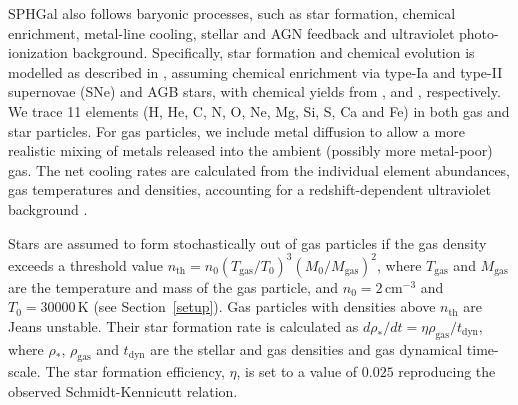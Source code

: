 \documentclass[fleqn,usenatbib]{mnras}
\begin{document}
SPHGal also follows baryonic
processes, such as star formation, chemical enrichment, metal-line
cooling, stellar and AGN feedback and ultraviolet photo-ionization
background. Specifically, star formation and chemical evolution is
modelled as described in \citet{Aumer13}, assuming chemical
enrichment via type-Ia and type-II supernovae (SNe) and AGB stars, with
 chemical yields from \citet{Woosley95}, \citet{Iwamoto99}  and
\citet{Karakas10}, respectively. We trace 11 elements (H, He, 
C, N, O, Ne, Mg, Si, S, Ca and Fe) in both gas and
star particles. For gas particles, we include metal diffusion
to allow a more realistic mixing of metals released into the 
ambient (possibly more metal-poor) gas. The net cooling rates are 
calculated from the individual element abundances, gas temperatures 
and densities, accounting for a redshift-dependent 
ultraviolet background \citep{Haardt01}. 

Stars are assumed to form stochastically out of gas particles if the gas
density exceeds a threshold value $n_{\mathrm{th}} = n_0
(T_{\mathrm{gas}}/T_0)^3 (M_0/M_{\mathrm{gas}})^2$, where 
$T_{\mathrm{gas}}$ and $M_{\mathrm{gas}}$ are the temperature
and mass of the gas particle, and $n_0 = 2\,\mathrm{cm}^{-3}$ and 
$T_0 = 30000\,$K (see Section~\ref{setup}). Gas particles with densities
above $n_{\mathrm{th}}$ are Jeans unstable. Their star formation rate 
is calculated as $d\rho_*/dt = \eta\rho_{\mathrm{gas}}/t_{\mathrm{dyn}}$, 
where $\rho_*$, $\rho_{\mathrm{gas}}$ and $t_{\mathrm{dyn}}$ are the
stellar and gas densities and gas dynamical time-scale. The star formation 
efficiency, $\eta$, is set to a value of $0.025$ reproducing the observed 
Schmidt-Kennicutt relation.
\end{document}
